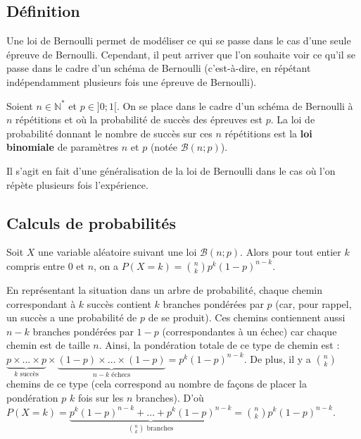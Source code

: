 	\subsection{Définition}
	
	Une loi de Bernoulli permet de modéliser ce qui se passe dans le cas d'une seule épreuve de Bernoulli. Cependant, il peut arriver que l'on souhaite voir ce qu'il se passe dans le cadre d'un schéma de Bernoulli (c'est-à-dire, en répétant indépendamment plusieurs fois une épreuve de Bernoulli).
	
	\begin{formula}[Définition]
		Soient $n \in \mathbb{N}^*$ et $p \in ]0; 1[$. On se place dans le cadre d'un schéma de Bernoulli à $n$ répétitions et où la probabilité de succès des épreuves est $p$.
		\newpar
		La loi de probabilité donnant le nombre de succès sur ces $n$ répétitions est la \textbf{loi binomiale} de paramètres $n$ et $p$ (notée $\mathcal{B}(n; p)$).
	\end{formula}
	
	\begin{tip}
		Il s'agit en fait d'une généralisation de la loi de Bernoulli dans le cas où l'on répète plusieurs fois l'expérience.
	\end{tip}
	
	\subsection{Calculs de probabilités}
	
	\begin{formula}
		Soit $X$ une variable aléatoire suivant une loi $\mathcal{B}(n; p)$. Alors pour tout entier $k$ compris entre $0$ et $n$, on a $P(X = k) = \binom{n}{k} p^k (1-p)^{n-k}$.
	\end{formula}
	
	\begin{demonstration}
		\contentwidth[big]
		En représentant la situation dans un arbre de probabilité, chaque chemin correspondant à $k$ succès contient $k$ branches pondérées par $p$ (car, pour rappel, un succès a une probabilité de $p$ de se produit). Ces chemins contiennent aussi $n-k$ branches pondérées par $1-p$ (correspondantes à un échec) car chaque chemin est de taille $n$. Ainsi, la pondération totale de ce type de chemin est :
		\newpar
		$\underbrace{p \times \dots \times p}_{k \text{ succès}} \times \underbrace{(1-p) \times \dots \times (1-p)}_{n-k \text{ échecs}} = p^k(1-p)^{n-k}$.
		\newpar
		De plus, il y a $\binom{n}{k}$ chemins de ce type (cela correspond au nombre de façons de placer la pondération $p$ $k$ fois sur les $n$ branches).
		\newpar
		D'où $P(X = k) = \underbrace{p^k(1-p)^{n-k} + \dots + p^k(1-p)^{n-k}}_{\binom{n}{k} \text{ branches}} = \binom{n}{k} p^k(1-p)^{n-k}$.
	\end{demonstration}
	
